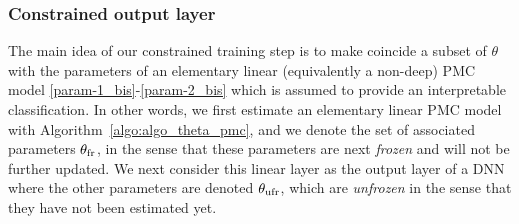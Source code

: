 

\subsubsection{Constrained output layer}
\label{sec:constrained_archi}
The main idea of our constrained training step is to make coincide a subset of $\theta$ %
with the parameters of an elementary linear (equivalently a non-deep) PMC model 
\eqref{param-1_bis}-\eqref{param-2_bis}
which is assumed to provide
an interpretable classification.
In other words, we first estimate an elementary linear PMC model with Algorithm~\ref{algo:algo_theta_pmc}, 
and we denote the set of 
associated parameters $\theta_{\mathrm{fr}}$, in the sense that these parameters are next \emph{frozen} and will not be further 
updated. We next consider this linear layer as the output layer of a DNN where
the other parameters are denoted $\theta_{\mathrm{ufr}}$, which
are \emph{unfrozen} in the sense that they have not been estimated yet. 


